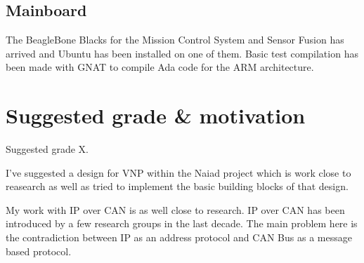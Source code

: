 \subsection{Mainboard}
The BeagleBone Blacks for the Mission Control System and Sensor Fusion
has arrived and Ubuntu has been installed on one of them. Basic test compilation
has been made with GNAT to compile Ada code for the ARM architecture.

\section{Suggested grade \& motivation}
Suggested grade X.

I've suggested a design for VNP within the Naiad project which is work close to
reasearch as well as tried to implement the basic building blocks of that
design.

My work with IP over CAN is as well close to research. IP over CAN has been
introduced by a few research groups in the last decade. The main problem here
is the contradiction between IP as an address protocol and CAN Bus as a message
based protocol.
